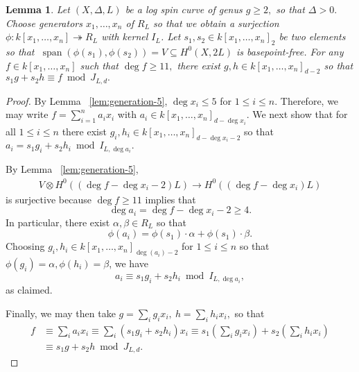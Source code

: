 \documentclass{amsart}
\theoremstyle{plain}
\newtheorem{lem}[thm]{Lemma}
\theoremstyle{definition}
\theoremstyle{remark}
\numberwithin{equation}{section}
\newcommand{\halfcan}{L}
\DeclareMathOperator{\newspan}{span}
\begin{document}
\begin{lem}
\label{lem:reducing-degree}
Let $(X, \Delta, \halfcan)$ be a log spin curve of genus $g \geq 2,$ so
that $\Delta > 0.$ Choose generators $x_1, \ldots, x_n$ of $R_\halfcan$ so
that we obtain a surjection $\phi: k[x_1, \ldots, x_n]
\twoheadrightarrow R_\halfcan$ with kernel $I_L$. Let $s_1, s_2 \in k[x_1,
\ldots, x_n]_2$ be two elements so that $\: \newspan(\phi(s_1), \phi(s_2))
= V \subseteq H^0(X, 2\halfcan)$ is basepoint-free. For any $f \in
k[x_1, \ldots, x_n]$ such that $\deg f \geq 11,$ there exist $g, h \in
k[x_1, \ldots, x_n]_{d - 2}$ so that $s_1 g + s_2 h \equiv f \bmod J_{\halfcan, d}.$
\end{lem}
\begin{proof}
By Lemma ~\ref{lem:generation-5}, $\deg x_i \leq 5$ for $1 \leq i \leq n$. Therefore, we may write $f = \sum_{i = 1}^{n}a_i x_i$ with $a_i \in k[x_1, \ldots, x_n]_{d-\deg x_i}$.
We next show that for all $1 \leq i \leq n$ there exist $g_i, h_i \in k[x_1, \ldots, x_n]_{d - \deg x_i - 2}$ so that $a_i = s_1g_i + s_2h_i \bmod I_{\halfcan, \deg a_i}.$ 

By Lemma ~\ref{lem:generation-5},
\begin{align*}
	V \otimes H^0((\deg f-\deg x_i -2)\halfcan) \rightarrow H^0((\deg f-\deg x_i)\halfcan)
\end{align*}
is surjective because $\deg f \geq 11$ implies that
$$\deg a_i =\deg f - \deg x_i -2 \geq 4.$$
In particular, there exist $\alpha, \beta \in R_L$ so that
$$\phi(a_i) = \phi(s_1) \cdot \alpha + \phi(s_1) \cdot \beta.$$ 
Choosing $g_i,h_i\in k[x_1, \ldots, x_n]_{\deg(a_i)-2}$ for $1 \leq i \leq n$ so that $\phi(g_i) = \alpha, \phi(h_i) = \beta$, we have 
$$a_i \equiv s_1 g_i + s_2 h_i \bmod I_{\halfcan, \deg a_i},$$ as claimed.

Finally, we may then take $g = \sum_{i}^{}g_i x_i, \: h = \sum_{i}^{}h_i x_i,$ so that 
\begin{align*}
	f &\equiv \sum_{i}^{}a_i x_i \equiv \sum_{i}^{}(s_1g_i + s_2h_i)x_i \equiv s_1 \left( \sum_{i}^{}g_i x_i \right) + s_2 \left( \sum_{i}^{}h_i x_i \right) \\
	&\equiv s_1 g + s_2 h \bmod J_{L,d}.
\end{align*}
\end{proof}
\end{document}
